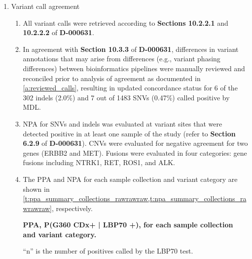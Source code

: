 \documentclass[12pt]{protocol}
\begin{document}
\begin{enumerate}
	\item Variant call agreement
	\begin{enumerate}
      \item All variant calls were retrieved according to \textbf{Sections 10.2.2.1} and
          \textbf{10.2.2.2} of \textbf{D-000631}.
      \item\label{i:manual_review} In agreement with \textbf{Section 10.3.3} of \textbf{D-000631},
          differences in variant annotations that may arise from differences (e.g., variant phasing
          differences) between bioinformatics pipelines were manually reviewed and reconciled prior
          to analysis of agreement as documented in \cref{a:reviewed_calls}, resulting in updated
          concordance status for 6 of the 302 indels (2.0\%) and 7 out of 1483 SNVs (0.47\%) called
          positive by MDL.\@
      \item NPA for SNVs and indels was evaluated at variant sites that were detected positive in
          at least one sample of the study (refer to \textbf{Section 6.2.9} of \textbf{D-000631}).
          CNVs were evaluated for negative agreement for two genes (ERBB2 and MET). Fusions were
          evaluated in four categories: gene fusions including NTRK1, RET, ROS1, and ALK.
      \item The PPA and NPA for each sample collection and variant category are shown in
          \cref{t:ppa_summary_collections_rawrawraw,t:npa_summary_collections_rawrawraw},
          respectively.
            
            \captionsetup{justification=justified,singlelinecheck=off,skip=0pt}
            \begin{table}[H]
            \centering
            \begin{threeparttable}
            \caption{\textbf{PPA, P(G360 CDx+ | LBP70 +), for each 
                sample collection and variant category.}}
            
            \caption*{``n'' is the number of positives called by the LBP70 test.}
            \label{t:ppa_summary_collections_rawrawraw}
            \end{threeparttable}
            \end{table}
            

\end{enumerate}
\end{enumerate}
\end{document}
